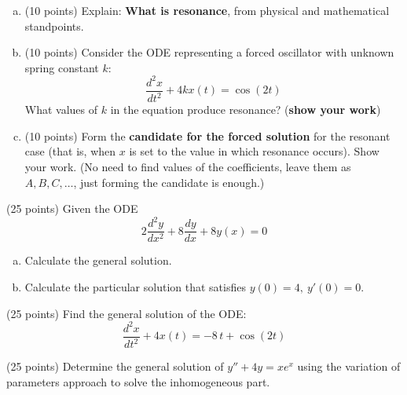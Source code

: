 \documentclass[10pt,twoside,sfsidenotes]{tufte-handout}
\begin{document}
\clearpage
\begin{question}
  \begin{fullwidth}
    \begin{enumerate}[(a)]
      \item(10 points) Explain: \textbf{What is resonance}, from physical and mathematical standpoints.

      \vspace{2in}

      \item(10 points) Consider the ODE representing a forced oscillator with unknown spring constant \(k\):
        \[
          \frac{d^{2}x}{dt^{2}} + 4 k x(t) = \cos(2t)
        \]
        What values of \(k\) in the equation produce resonance? (\textbf{show your work})
      
      \vfill

      \item(10 points) Form the \textbf{candidate for the forced solution} for the resonant case (that is, when \(x\) is set to the value in which resonance occurs).
      Show your work. (No need to find values of the coefficients, leave them as \(A,B,C,\dots\), just forming the candidate is enough.)

      \vfill

    \end{enumerate}
  \end{fullwidth}
\end{question}


\clearpage
\begin{question}(25 points)
  Given the ODE 
  \[
    2\frac{d^{2}y}{dx^{2}} + 8 \frac{dy}{dx} + 8 y(x) = 0
  \]
  \begin{enumerate}[(a)]
    \item Calculate the general solution.
    
    \vfill

    \item Calculate the particular solution that satisfies \(y(0) = 4,\ y'(0) = 0\).

    \vfill
  \end{enumerate}
\end{question}


\clearpage
\begin{question}(25 points)
  Find the general solution of the ODE: 
  \[
    \frac{d^{2}x}{dt^{2}} + 4x(t) = -8\,t + \cos(2t)
  \]
\end{question}


\clearpage
\begin{question}(25 points)
  Determine the general solution of \(y'' + 4y = xe^x\) using the variation of parameters approach to solve the inhomogeneous part.
\end{question}
\end{document}
